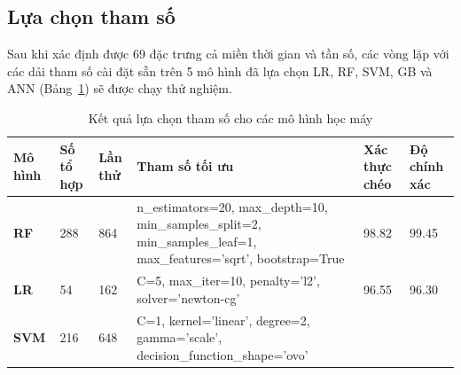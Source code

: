 \subsection{Lựa chọn tham số}
Sau khi xác định được 69 đặc trưng cả miền thời gian và tần số, các vòng lặp
với các dải tham số cài đặt sẵn trên 5 mô hình đã lựa chọn LR, RF, SVM, GB và
ANN (Bảng~\ref{tab:model_results}) sẽ được chạy thử nghiệm.
\begin{table}[H]
    \centering
    \renewcommand{\arraystretch}{1.3}
    \setlength{\tabcolsep}{5pt}
    \caption{Kết quả lựa chọn tham số cho các mô hình học máy}
    \label{tab:model_results}
    \small
    \begin{tabular}{|l|p{1cm}|p{1cm}|p{7cm}|p{1.5cm}|p{1.5cm}|}
        \hline
        \textbf{Mô hình}                                                                                                                         & \textbf{Số tổ hợp} & \textbf{Lần thử} & \textbf{Tham số tối ưu} & \textbf{Xác thực chéo} & \textbf{Độ chính xác} \\
        \hline
        \textbf{RF}                                                                                                                              & 288                & 864              &
        \raggedright\ttfamily n\_estimators=20, max\_depth=10, min\_samples\_split=2, min\_samples\_leaf=1, max\_features='sqrt', bootstrap=True &
        98.82                                                                                                                                    & 99.45                                                                                                            \\
        \hline
        \textbf{LR}                                                                                                                              & 54                 & 162              &
        \raggedright\ttfamily C=5, max\_iter=10, penalty='l2', solver='newton-cg'                                                                &
        96.55                                                                                                                                    & 96.30                                                                                                            \\
        \hline
        \textbf{SVM}                                                                                                                             & 216                & 648              &
        \raggedright\ttfamily C=1, kernel='linear', degree=2, gamma='scale', decision\_function\_shape='ovo'                                     &

\end{tabular}
\end{table}
